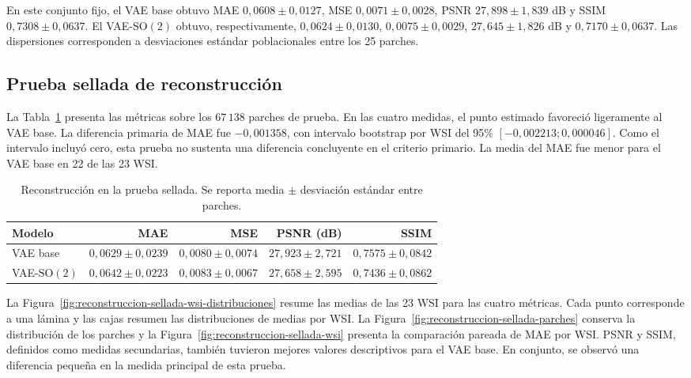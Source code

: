 En este conjunto fijo, el VAE base obtuvo MAE
\(0,0608\pm0,0127\), MSE \(0,0071\pm0,0028\), PSNR
\(27,898\pm1,839\) dB y SSIM \(0,7308\pm0,0637\). El
VAE-\(\mathrm{SO}(2)\) obtuvo, respectivamente,
\(0,0624\pm0,0130\), \(0,0075\pm0,0029\),
\(27,645\pm1,826\) dB y \(0,7170\pm0,0637\). Las dispersiones corresponden a
desviaciones estándar poblacionales entre los 25 parches.

\FloatBarrier

\subsection{Prueba sellada de reconstrucción}

La Tabla~\ref{tab:reconstruccion-sellada} presenta las métricas sobre los
\(67\,138\) parches de prueba. En las cuatro medidas, el punto estimado favoreció
ligeramente al VAE base. La diferencia primaria de MAE fue \(-0,001358\), con
intervalo bootstrap por WSI del 95\% \([-0,002213;0,000046]\). Como el intervalo
incluyó cero, esta prueba no sustenta una diferencia concluyente en el criterio
primario. La media del MAE fue menor para el VAE base en 22 de las 23 WSI.

\begin{table}[htbp]
    \centering
    \caption{Reconstrucción en la prueba sellada. Se reporta media
    \(\pm\) desviación estándar entre parches.}
    \label{tab:reconstruccion-sellada}
    \small
    \begin{tabular}{@{}lrrrr@{}}
        \toprule
        Modelo & MAE & MSE & PSNR (dB) & SSIM \\
        \midrule
        VAE base & \(0,0629\pm0,0239\) & \(0,0080\pm0,0074\) & \(27,923\pm2,721\) & \(0,7575\pm0,0842\) \\
        VAE-\(\mathrm{SO}(2)\) & \(0,0642\pm0,0223\) & \(0,0083\pm0,0067\) & \(27,658\pm2,595\) & \(0,7436\pm0,0862\) \\
        \bottomrule
    \end{tabular}
\end{table}

\begin{samepage}
La Figura~\ref{fig:reconstruccion-sellada-wsi-distribuciones} resume las
medias de las 23 WSI para las cuatro métricas. Cada punto corresponde a una
lámina y las cajas resumen las distribuciones de medias por WSI. La
Figura~\ref{fig:reconstruccion-sellada-parches} conserva la distribución de
los parches y la Figura~\ref{fig:reconstruccion-sellada-wsi} presenta la
comparación pareada de MAE por WSI. PSNR y SSIM, definidos como medidas secundarias, también tuvieron mejores
valores descriptivos para el VAE base. En conjunto, se observó una diferencia
pequeña en la medida principal de esta prueba.
\par
\end{samepage}

